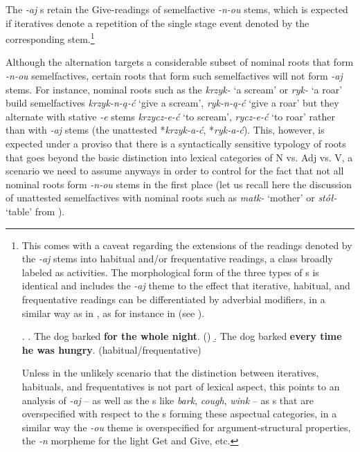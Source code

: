 \noindent The \textit{-aj} s retain the Give-readings  of  semelfactive \textit{-n-ou} stems, which is expected if iteratives denote a repetition of the single stage event denoted by the corresponding  stem.\footnote{This comes with a caveat regarding the extensions of the  readings denoted by the \textit{-aj} stems into habitual and/or frequentative readings, a class broadly labeled as activities. The morphological form of the three types of  s is identical and includes the \textit{-aj} theme to the effect that iterative, habitual, and frequentative readings can be differentiated by adverbial modifiers, in a similar way as in , as for instance in \Next (see \citealt{Carlson2012}). 

\noindent\parbox{\linguexfootnotewidth}{\ex. 
\a. The dog barked \textbf{for the whole night}. \hfill ()
\b. The dog barked \textbf{every time he was hungry}.  \hfill (habitual/frequentative)

}

\noindent Unless in the unlikely scenario that the distinction between iteratives, habituals, and frequentatives is not part of lexical aspect, this points to an analysis of \textit{-aj} -- as well as the  s like \textit{bark}, \textit{cough}, \textit{wink} -- as s that are overspecified with respect to the s forming these aspectual categories, in a similar way the \textit{-ou} theme is  overspecified for argument-structural properties, the \textit{-n} morpheme for the light Get and Give, etc. 
} %
\par
Although the  alternation targets a considerable subset of nominal roots that form \textit{-n-ou} semelfactives, certain roots that form such semelfactives will not form  \textit{-aj} stems. For instance, nominal roots such as the  \textit{krzyk-} `a scream' or \textit{ryk-} `a roar' build  semelfactives \textit{krzyk-n-\k{a}-\'c} `give a scream', \textit{ryk-n-\k{a}-\'c} `give a roar' but they alternate with stative \textit{-e} stems \textit{krzycz-e-\'c} `to scream', \textit{rycz-e-\'c} `to roar' rather than with  \textit{-aj} stems (the unattested *\textit{krzyk-a-\'c}, *\textit{ryk-a-\'c}). This, however, is expected under a proviso that there is a syntactically sensitive typology of roots that goes beyond the basic distinction into lexical categories of N vs. Adj vs. V, a scenario we need to assume anyways in order to control for the fact that not all nominal roots form  \textit{-n-ou} stems in the first place (let us recall here the discussion of unattested  semelfactives with nominal roots such as \textit{matk-} `mother' or \textit{st\'o\l-} `table' from ).
